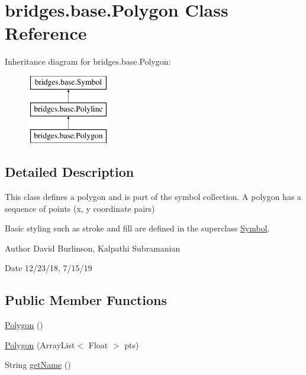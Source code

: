 \hypertarget{classbridges_1_1base_1_1_polygon}{}\section{bridges.\+base.\+Polygon Class Reference}
\label{classbridges_1_1base_1_1_polygon}
Inheritance diagram for bridges.\+base.\+Polygon\+:\begin{figure}[H]
\begin{center}
\leavevmode
\includegraphics[height=3.000000cm]{classbridges_1_1base_1_1_polygon}
\end{center}
\end{figure}


\subsection{Detailed Description}
This class defines a polygon and is part of the symbol collection. A polygon has a sequence of points (x, y coordinate pairs) 

Basic styling such as stroke and fill are defined in the superclass \mbox{\hyperlink{classbridges_1_1base_1_1_symbol}{Symbol}}.

\begin{DoxyAuthor}{Author}
David Burlinson, Kalpathi Subramanian 
\end{DoxyAuthor}
\begin{DoxyDate}{Date}
12/23/18, 7/15/19 
\end{DoxyDate}
\subsection*{Public Member Functions}
\begin{DoxyCompactItemize}
\item 
\mbox{\hyperlink{classbridges_1_1base_1_1_polygon_af0c1b3bc3147ffbda98fd9c515a8052d}{Polygon}} ()
\item 
\mbox{\hyperlink{classbridges_1_1base_1_1_polygon_a341cc297ba7f0f201d31aa3c98ecf108}{Polygon}} (Array\+List$<$ Float $>$ pts)
\item 
String \mbox{\hyperlink{classbridges_1_1base_1_1_polygon_a2203367acb1a26dfa1a81d69ce61274f}{get\+Name}} ()
\end{DoxyCompactItemize}
